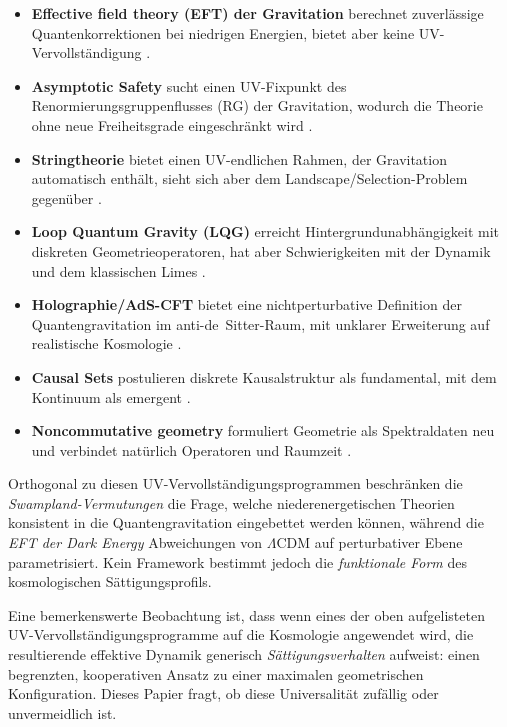 \documentclass[aps,prd,twocolumn,superscriptaddress,nofootinbib]{revtex4-2}
\begin{document}
\begin{itemize}
\item \textbf{Effective field theory (EFT) der Gravitation} berechnet zuverlässige Quantenkorrektionen bei niedrigen Energien, bietet aber keine UV-Vervollständigung \cite{Donoghue1994}.
\item \textbf{Asymptotic Safety} sucht einen UV-Fixpunkt des Renormierungsgruppenflusses (RG) der Gravitation, wodurch die Theorie ohne neue Freiheitsgrade eingeschränkt wird \cite{Weinberg1979,Reuter1998,Percacci2017}.
\item \textbf{Stringtheorie} bietet einen UV-endlichen Rahmen, der Gravitation automatisch enthält, sieht sich aber dem Landscape/Selection-Problem gegenüber \cite{Polchinski1998}.
\item \textbf{Loop Quantum Gravity (LQG)} erreicht Hintergrundunabhängigkeit mit diskreten Geometrieoperatoren, hat aber Schwierigkeiten mit der Dynamik und dem klassischen Limes \cite{Rovelli2004,Thiemann2007}.
\item \textbf{Holographie/AdS-CFT} bietet eine nichtperturbative Definition der Quantengravitation im anti-de~Sitter-Raum, mit unklarer Erweiterung auf realistische Kosmologie \cite{Maldacena1999}.
\item \textbf{Causal Sets} postulieren diskrete Kausalstruktur als fundamental, mit dem Kontinuum als emergent \cite{Sorkin2003,Surya2019}.
\item \textbf{Noncommutative geometry} formuliert Geometrie als Spektraldaten neu und verbindet natürlich Operatoren und Raumzeit \cite{Connes1994}.
\end{itemize}

Orthogonal zu diesen UV-Vervollständigungsprogrammen beschränken die \textit{Swampland-Vermutungen} \cite{Obied2018} die Frage, welche niederenergetischen Theorien konsistent in die Quantengravitation eingebettet werden können, während die \textit{EFT der Dark Energy} \cite{Gubitosi2013} Abweichungen von $\Lambda$CDM auf perturbativer Ebene parametrisiert. Kein Framework bestimmt jedoch die \textit{funktionale Form} des kosmologischen Sättigungsprofils.

Eine bemerkenswerte Beobachtung ist, dass wenn eines der oben aufgelisteten UV-Vervollständigungsprogramme auf die Kosmologie angewendet wird, die resultierende effektive Dynamik generisch \textit{Sättigungsverhalten} aufweist: einen begrenzten, kooperativen Ansatz zu einer maximalen geometrischen Konfiguration. Dieses Papier fragt, ob diese Universalität zufällig oder unvermeidlich ist.
\end{document}
